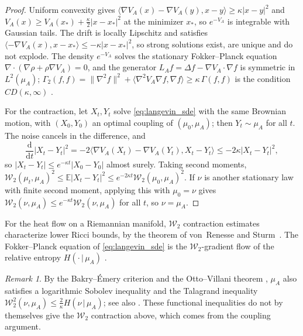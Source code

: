 \documentclass[11pt,a4paper,reqno]{amsart}
\theoremstyle{definition}
\theoremstyle{remark}
\newtheorem{remark}[theorem]{Remark}
\numberwithin{equation}{section}
\newcommand{\dif}{\mathrm{d}}
\begin{document}
\begin{proof}
Uniform convexity gives $\langle \nabla V_A(x) - \nabla V_A(y), x - y\rangle \ge \kappa |x - y|^2$ and $V_A(x) \ge V_A(x_*) + \tfrac{\kappa}{2}|x - x_*|^2$ at the minimizer $x_*$, so $e^{-V_A}$ is integrable with Gaussian tails. The drift is locally Lipschitz and satisfies $\langle -\nabla V_A(x), x - x_*\rangle \le -\kappa|x - x_*|^2$, so strong solutions exist, are unique and do not explode. The density $e^{-V_A}$ solves the stationary Fokker--Planck equation $\nabla\cdot(\nabla \rho + \rho\nabla V_A) = 0$, and the generator $L_A f = \Delta f - \nabla V_A \cdot \nabla f$ is symmetric in $L^2(\mu_A)$; $\Gamma_2(f,f) = \|\nabla^2 f\|^2 + \langle \nabla^2 V_A \nabla f, \nabla f\rangle \ge \kappa\,\Gamma(f,f)$ is the condition $CD(\kappa,\infty)$ \cite{BakryEmery1985}.

For the contraction, let $X_t, Y_t$ solve \eqref{eq:langevin_sde} with the same Brownian motion, with $(X_0, Y_0)$ an optimal coupling of $(\mu_0, \mu_A)$; then $Y_t \sim \mu_A$ for all $t$. The noise cancels in the difference, and
\begin{equation}
\frac{\dif}{\dif t}|X_t - Y_t|^2 = -2\langle \nabla V_A(X_t) - \nabla V_A(Y_t), X_t - Y_t\rangle \le -2\kappa |X_t - Y_t|^2,
\end{equation}
so $|X_t - Y_t| \le e^{-\kappa t}|X_0 - Y_0|$ almost surely. Taking second moments, $\mathcal{W}_2(\mu_t, \mu_A)^2 \le \mathbb{E}|X_t - Y_t|^2 \le e^{-2\kappa t}\mathcal{W}_2(\mu_0,\mu_A)^2$. If $\nu$ is another stationary law with finite second moment, applying this with $\mu_0 = \nu$ gives $\mathcal{W}_2(\nu,\mu_A) \le e^{-\kappa t}\mathcal{W}_2(\nu,\mu_A)$ for all $t$, so $\nu = \mu_A$.
\end{proof}

\noindent For the heat flow on a Riemannian manifold, $\mathcal{W}_2$ contraction estimates characterize lower Ricci bounds, by the theorem of von~Renesse and Sturm~\cite{vonRenesseSturm2005}. The Fokker--Planck equation of \eqref{eq:langevin_sde} is the $\mathcal{W}_2$-gradient flow of the relative entropy $H(\cdot\,|\,\mu_A)$ \cite{JordanKinderlehrerOtto1998}.

\begin{remark}
By the Bakry--\'Emery criterion and the Otto--Villani theorem \cite{BakryEmery1985,OttoVillani2000}, $\mu_A$ also satisfies a logarithmic Sobolev inequality and the Talagrand inequality \cite{Talagrand1996} $\mathcal{W}_2^2(\nu,\mu_A) \le \frac{2}{\kappa}H(\nu\,|\,\mu_A)$; see also \cite[Ch.~22]{Villani2009}. These functional inequalities do not by themselves give the $\mathcal{W}_2$ contraction above, which comes from the coupling argument.
\end{remark}
\end{document}
